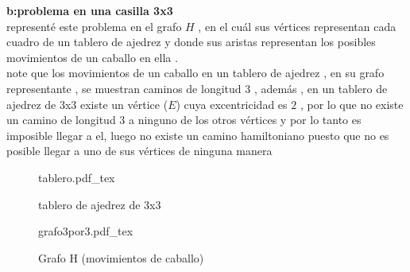 \documentclass[10pt,a4paper]{article} %
\newcommand{\incfig}[1]{%
    \def\svgwidth{\columnwidth}
    {#1.pdf_tex}
}
\begin{document}
    \newpage
    \textbf{b:problema en una casilla 3x3}
    \\
    representé este problema en el grafo $H$ , en el cuál sus vértices
    representan cada cuadro de un tablero de ajedrez y donde sus aristas
    representan los posibles movimientos de un caballo en ella .
    \\
    note que los movimientos de un caballo en un tablero de ajedrez , en su grafo representante ,
    se muestran caminos de longitud 3 , además , en un tablero de
    ajedrez de 3x3 existe un vértice ($E$) cuya excentricidad es $2$ , por lo que no
    existe un camino de longitud 3 a ninguno de los otros vértices y por lo
    tanto es imposible llegar a el, luego no existe un camino hamiltoniano
    puesto que no es posible llegar a uno de sus vértices de ninguna manera

    \begin{figure}[ht]
        \centering
        \incfig{tablero}
        \caption{tablero de ajedrez de 3x3}
        \label{fig:tablero}
    \end{figure}


    \begin{figure}[ht]
        \centering
        \incfig{grafo3por3}
        \caption{Grafo H (movimientos de caballo)}
        \label{fig:grafo3por3}
    \end{figure}























    \nocite{*}
    
    
\end{document}

